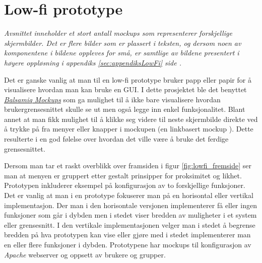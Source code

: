 \section{Low-fi prototype} \label{sec:lowfi}
\emph{Avsnittet inneholder et stort antall mockups som representerer forskjellige skjermbilder. Det er flere bilder som er plassert i teksten, og dersom noen av komponentene i bildene oppleves for små, er samtlige av bildene presentert i høyere oppløsning i appendiks \ref{sec:appendiksLowFi} side \pageref{sec:appendiksLowFi}.}

Det er ganske vanlig at man til en low-fi prototype bruker papp eller papir for å visualisere hvordan man kan bruke en GUI. I dette prosjektet ble det benyttet \href{http://balsamiq.com/products/mockups/}{\textit{Balsamiq Mockups}} som ga mulighet til å ikke bare visualisere hvordan brukergrensesnittet skulle se ut men også legge inn enkel funksjonalitet. Blant annet at man fikk mulighet til å klikke seg videre til neste skjermbilde direkte ved å trykke på fra menyer eller knapper i mockupen (en linkbasert mockup \cite{book:utforming}). Dette resulterte i en god følelse over hvordan det ville være å bruke det ferdige grensesnittet.

Dersom man tar et raskt overblikk over framsiden i figur \ref{fig:lowfi_fremside} ser man at menyen er gruppert etter gestalt prinsipper for proksimitet og likhet.\cite{forelesning:tulpesh}
Prototypen inkluderer eksempel på konfigurasjon av to forskjellige funksjoner.
Det er vanlig at man i en prototype fokuserer man på en horisontal eller vertikal implementasjon. Der man i den horisontale versjonen implementerer få eller ingen funksjoner som går i dybden men i stedet viser bredden av muligheter i et system eller grensesnitt. I den vertikale implementasjonen velger man i stedet å begrense bredden på hva prototypen kan vise eller gjøre med i stedet implementerer man en eller flere funksjoner i dybden.\cite{book:utforming}
Prototypene har mockups til konfigurasjon av \textit{Apache} webserver og oppsett av brukere og grupper. 

